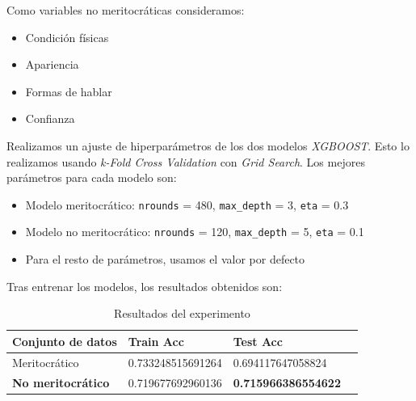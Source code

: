 \documentclass[11pt]{article}
\begin{document}
Como variables no meritocráticas consideramos:
\begin{itemize}
    \item Condición físicas
    \item Apariencia
    \item Formas de hablar
    \item Confianza
\end{itemize}

Realizamos un ajuste de hiperparámetros de los dos modelos \textit{XGBOOST}. Esto lo realizamos usando \textit{k-Fold Cross Validation} con \textit{Grid Search}. Los mejores parámetros para cada modelo son:

\begin{itemize}
    \item Modelo meritocrático: \lstinline{nrounds} = 480, \lstinline{max_depth} = 3, \lstinline{eta} = 0.3
    \item Modelo no meritocrático: \lstinline{nrounds} = 120, \lstinline{max_depth} = 5, \lstinline{eta} = 0.1
    \item Para el resto de parámetros, usamos el valor por defecto
\end{itemize}

Tras entrenar los modelos, los resultados obtenidos son:

\begin{table}[H]
\centering
\begin{tabular}{|l|l|l|l}
\hline
Conjunto de datos    & Train Acc         & Test Acc              \\
\hline
Meritocrático        & 0.733248515691264 & 0.694117647058824     \\
    \textbf{No meritocrático} & 0.719677692960136 & \textbf{0.715966386554622} \\
\hline

\end{tabular}
\caption{Resultados del experimento}
\end{table}


\newpage


\newpage


\newpage

\pagebreak





\end{document}
